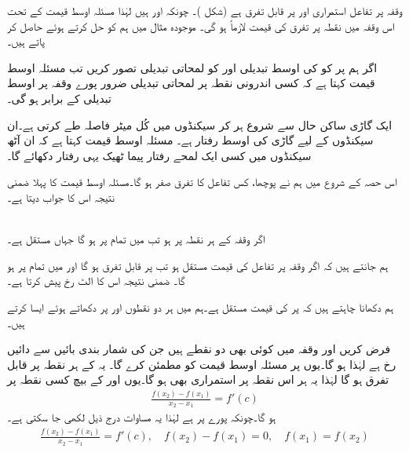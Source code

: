 وقفہ  پر تفاعل  استمراری  اور  پر  قابل تفرق ہے (شکل )۔ چونکہ  اور  ہیں لہٰذا مسئلہ اوسط قیمت کے تحت اس وقفہ میں نقطہ  پر تفرق  کی قیمت لازماً  ہو گی۔ موجودہ مثال میں ہم  کو حل کرتے ہوئے   حاصل کر پاتے ہیں۔ 

اگر ہم  پر  کو  کی  اوسط تبدیلی اور  کو لمحاتی تبدیلی تصور کریں تب مسئلہ اوسط قیمت کہتا ہے کہ کسی اندرونی   نقطہ پر لمحاتی تبدیلی ضرور پورے وقفہ پر اوسط تبدیلی کے برابر ہو گی۔

ایک گاڑی ساکن حال سے شروع ہر کر  سیکنڈوں میں کُل  میٹر فاصلہ طے کرتی ہے۔ان  سیکنڈوں کے لیے گاڑی کی اوسط رفتار  ہے۔ مسئلہ اوسط قیمت کہتا ہے  کہ  ان آٹھ سیکنڈوں میں کسی  ایک لمحے رفتار پیما ٹھیک یہی رفتار دکھائے گا۔


اس حصہ کے شروع میں ہم نے پوچھا،  کس تفاعل کا تفرق صفر ہو گا۔مسئلہ اوسط قیمت کا پہلا ضمنی نتیجہ اس کا جواب دیتا ہے۔

\\
اگر وقفہ  کے ہر نقطہ پر  ہو تب  میں تمام  پر  ہو گا جہاں  مستقل ہے۔

ہم جانتے ہیں کہ اگر وقفہ  پر تفاعل  کی قیمت مستقل ہو تب  پر  قابل تفرق ہو گا اور  میں تمام  پر  ہو گا۔ ضمنی نتیجہ اس کا الٹ  رخ پیش کرتا ہے۔

ہم دکھانا چاہتے ہیں کہ  پر  کی قیمت مستقل ہے۔ہم  میں ہر دو نقطوں  اور  پر  دکھاتے ہوئے ایسا کرتے ہیں۔

فرض کریں  اور  وقفہ  میں کوئی بھی دو نقطے ہیں جن کی شمار  بندی بائیں سے دائیں  رخ  ہے لہٰذا  ہو گا۔یوں  پر  مسئلہ اوسط قیمت کو مطمئن کرے گا۔ یہ  کے ہر نقطہ پر قابل تفرق ہو گا لہٰذا یہ ہر اس نقطہ پر استمراری بھی ہو گا۔یوں  اور  کے بیچ کسی نقطہ  پر
\begin{align*}
\frac{f(x_2)-f(x_1)}{x_2-x_1}=f'(c)
\end{align*}
ہو گا۔چونکہ پورے  پر  ہے لہٰذا یہ مساوات  درج ذیل لکھی جا سکتی ہے۔
\begin{align*}
\frac{f(x_2)-f(x_1)}{x_2-x_1}=f'(c),\quad f(x_2)-f(x_1)=0,\quad f(x_1)=f(x_2)
\end{align*}

